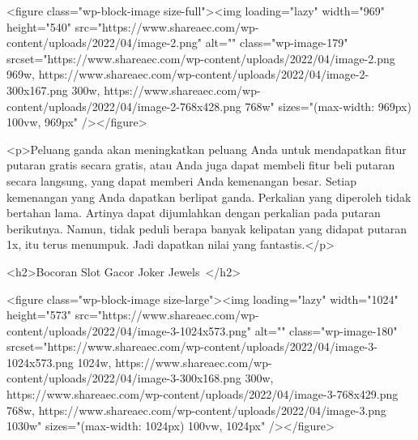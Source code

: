 {<figure class="wp-block-image size-full"><img loading="lazy" width="969" height="540" src="https://www.shareaec.com/wp-content/uploads/2022/04/image-2.png" alt="" class="wp-image-179" srcset="https://www.shareaec.com/wp-content/uploads/2022/04/image-2.png 969w, https://www.shareaec.com/wp-content/uploads/2022/04/image-2-300x167.png 300w, https://www.shareaec.com/wp-content/uploads/2022/04/image-2-768x428.png 768w" sizes="(max-width: 969px) 100vw, 969px" /></figure>



<p>Peluang ganda akan meningkatkan peluang Anda untuk mendapatkan fitur putaran gratis secara gratis, atau Anda juga dapat membeli fitur beli putaran secara langsung, yang dapat memberi Anda kemenangan besar. Setiap kemenangan yang Anda dapatkan berlipat ganda. Perkalian yang diperoleh tidak bertahan lama. Artinya dapat dijumlahkan dengan perkalian pada putaran berikutnya. Namun, tidak peduli berapa banyak kelipatan yang didapat putaran 1x, itu terus menumpuk. Jadi dapatkan nilai yang fantastis.</p>



<h2>Bocoran Slot Gacor Joker Jewels </h2>



<figure class="wp-block-image size-large"><img loading="lazy" width="1024" height="573" src="https://www.shareaec.com/wp-content/uploads/2022/04/image-3-1024x573.png" alt="" class="wp-image-180" srcset="https://www.shareaec.com/wp-content/uploads/2022/04/image-3-1024x573.png 1024w, https://www.shareaec.com/wp-content/uploads/2022/04/image-3-300x168.png 300w, https://www.shareaec.com/wp-content/uploads/2022/04/image-3-768x429.png 768w, https://www.shareaec.com/wp-content/uploads/2022/04/image-3.png 1030w" sizes="(max-width: 1024px) 100vw, 1024px" /></figure>



}

